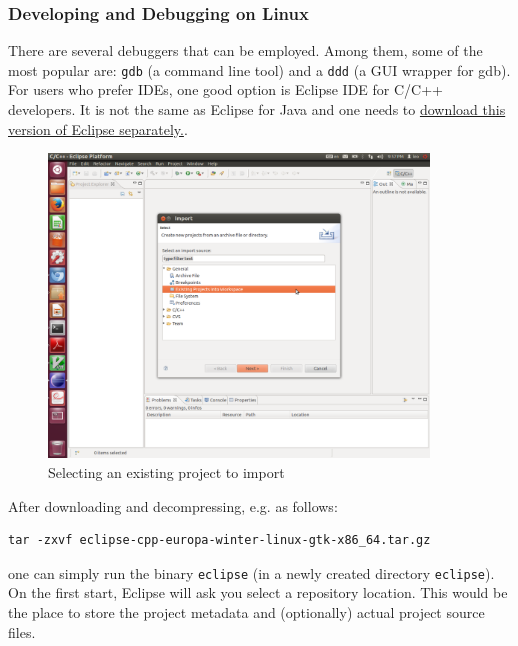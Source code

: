 \documentclass[runningheads,a4paper]{llncs}
\newcommand{\ttt}[1]{\texttt{#1}}
\begin{document}
{\subsubsection{Developing and Debugging on Linux}
There are several debuggers that can be employed.
Among them, some of the most popular are: \ttt{gdb} (a command line tool)
and a \ttt{ddd} (a GUI wrapper for gdb).
For users who prefer IDEs, one good option is Eclipse IDE for C/C++
developers.
It is not the same as Eclipse for Java and one needs 
to \href{http://www.eclipse.org/downloads/moreinfo/c.php}{download 
this version of Eclipse separately.}.

\begin{figure}
\caption{\label{FigEclipse1}Selecting an existing project to import}
\includegraphics[width=0.9\textwidth]{figures/Eclipse1.pdf}
\end{figure}

After downloading and decompressing, e.g. as follows:
\begin{verbatim}
tar -zxvf eclipse-cpp-europa-winter-linux-gtk-x86_64.tar.gz
\end{verbatim}
one can simply run the binary \ttt{eclipse} (in a
newly created directory \ttt{eclipse}).
On the first start, Eclipse will ask you select a repository location.
This would be the place to store the project metadata and (optionally)
actual project source files.

}
\end{document}
